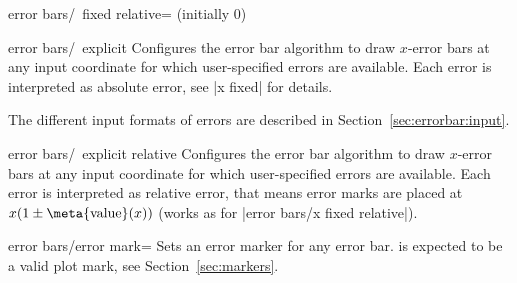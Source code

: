 {\begin{pgfplotsxykey}{error bars/\x\ fixed relative= (initially 0)}
\begin{codeexample}[]
\end{codeexample}
\end{pgfplotsxykey}

\begin{pgfplotsxykey}{error bars/\x\ explicit}
Configures the error bar algorithm to draw $x$-error bars at any input coordinate for which user-specified errors are available.
 Each error is interpreted as absolute error, see |x fixed| for details.

The different input formats of errors are described in Section~\ref{sec:errorbar:input}.
\end{pgfplotsxykey}

\begin{pgfplotsxykey}{error bars/\x\ explicit relative}
Configures the error bar algorithm to draw $x$-error bars at any input coordinate for which user-specified errors are available.
 Each error is interpreted as relative error, that means error marks are placed at $x (1 \pm \text{\meta{value}}(x))$ (works as for |error bars/x fixed relative|).
\begin{codeexample}[]
\end{codeexample}

\end{pgfplotsxykey}


\begin{pgfplotskey}{error bars/error mark=}
Sets an error marker for any error bar.  is expected to be a valid plot mark, see Section~\ref{sec:markers}.
\begin{codeexample}[]
\end{codeexample}
\end{pgfplotskey}

}
